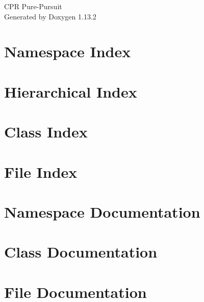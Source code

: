 \documentclass[twoside]{book}
\newcommand{\+}{\discretionary{\mbox{\scriptsize$\hookleftarrow$}}{}{}}
\newcommand{\clearemptydoublepage}{%
    \newpage{\pagestyle{empty}\cleardoublepage}%
  }
\begin{document}
  \raggedbottom
    \hypersetup{pageanchor=false,
                bookmarksnumbered=true,
                pdfencoding=unicode
               }
  \begin{titlepage}
  \vspace*{7cm}
  \begin{center}%
  {\Large CPR Pure-\/\+Pursuit}\\
  \vspace*{1cm}
  {\large Generated by Doxygen 1.13.2}\\
  \end{center}
  \end{titlepage}
  \clearemptydoublepage
  \tableofcontents
  \clearemptydoublepage
  \hypersetup{pageanchor=true}
\chapter{Namespace Index}

\chapter{Hierarchical Index}

\chapter{Class Index}

\chapter{File Index}

\chapter{Namespace Documentation}

\chapter{Class Documentation}


\chapter{File Documentation}



  \backmatter
  \newpage
  \clearemptydoublepage
  \printindex
\end{document}
